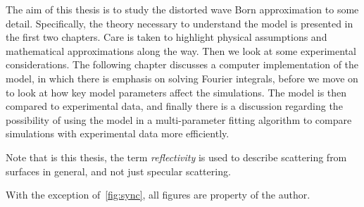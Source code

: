 \documentclass[10pt,twoside, b5paper,pdftex]{report}
\begin{document}
The aim of this thesis is to study the distorted wave Born approximation to some detail. Specifically, the theory necessary to understand the model is presented in the first two chapters. Care is taken to highlight physical assumptions and mathematical approximations along the way. Then we look  at some experimental considerations.  The following chapter  discusses a computer implementation of the model, in which there is emphasis on solving Fourier integrals, before we move on to look at how key model parameters affect the simulations. The model is then compared to experimental data, and finally there is a discussion regarding the possibility of using the model in a multi-parameter fitting algorithm to compare simulations with experimental data more efficiently. 

 Note that is this thesis, the term {\it reflectivity} is used to describe scattering from surfaces in general, and not just specular scattering.


With the exception of~\cref{fig:sync}, all figures are property of the author.
\end{document}
